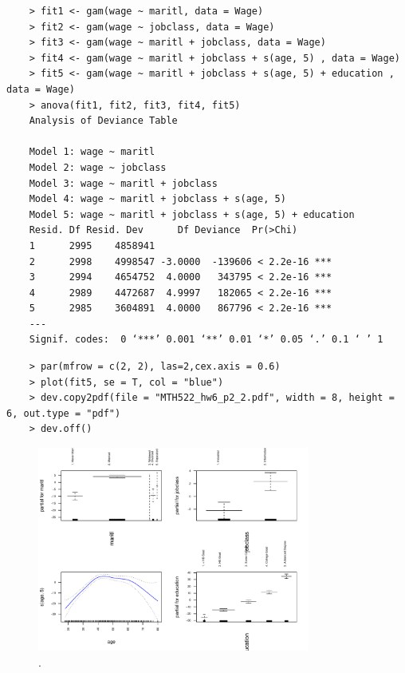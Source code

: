 \documentclass{article}
\begin{document}
\begin{program}
	\begin{verbatim}
	> fit1 <- gam(wage ~ maritl, data = Wage)
	> fit2 <- gam(wage ~ jobclass, data = Wage)
	> fit3 <- gam(wage ~ maritl + jobclass, data = Wage)
	> fit4 <- gam(wage ~ maritl + jobclass + s(age, 5) , data = Wage)
	> fit5 <- gam(wage ~ maritl + jobclass + s(age, 5) + education , data = Wage)
	> anova(fit1, fit2, fit3, fit4, fit5)
	Analysis of Deviance Table
	
	Model 1: wage ~ maritl
	Model 2: wage ~ jobclass
	Model 3: wage ~ maritl + jobclass
	Model 4: wage ~ maritl + jobclass + s(age, 5)
	Model 5: wage ~ maritl + jobclass + s(age, 5) + education
	Resid. Df Resid. Dev      Df Deviance  Pr(>Chi)    
	1      2995    4858941                               
	2      2998    4998547 -3.0000  -139606 < 2.2e-16 ***
	3      2994    4654752  4.0000   343795 < 2.2e-16 ***
	4      2989    4472687  4.9997   182065 < 2.2e-16 ***
	5      2985    3604891  4.0000   867796 < 2.2e-16 ***
	---
	Signif. codes:  0 ‘***’ 0.001 ‘**’ 0.01 ‘*’ 0.05 ‘.’ 0.1 ‘ ’ 1
	\end{verbatim}
\end{program}

\newpage


\begin{program}
	\begin{verbatim}
	> par(mfrow = c(2, 2), las=2,cex.axis = 0.6)
	> plot(fit5, se = T, col = "blue")
	> dev.copy2pdf(file = "MTH522_hw6_p2_2.pdf", width = 8, height = 6, out.type = "pdf")
	> dev.off()
	\end{verbatim}
\end{program}

\begin{figure}[htb]
	\begin{center}
		\includegraphics[width=0.8\textwidth]{MTH522_hw6_p2_2.pdf}
	\end{center}
	\caption{.}
	\label{fig:MTH522_hw6_p2_2}
\end{figure}
\end{document}
